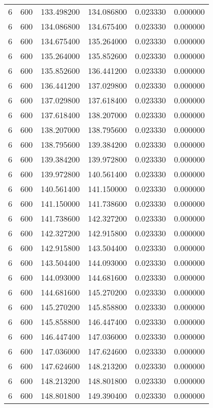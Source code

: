 \begin{longtable}{rrrrrr}
6 & 600 & 133.498200 & 134.086800 & 0.023330 & 0.000000 \\
6 & 600 & 134.086800 & 134.675400 & 0.023330 & 0.000000 \\
6 & 600 & 134.675400 & 135.264000 & 0.023330 & 0.000000 \\
6 & 600 & 135.264000 & 135.852600 & 0.023330 & 0.000000 \\
6 & 600 & 135.852600 & 136.441200 & 0.023330 & 0.000000 \\
6 & 600 & 136.441200 & 137.029800 & 0.023330 & 0.000000 \\
6 & 600 & 137.029800 & 137.618400 & 0.023330 & 0.000000 \\
6 & 600 & 137.618400 & 138.207000 & 0.023330 & 0.000000 \\
6 & 600 & 138.207000 & 138.795600 & 0.023330 & 0.000000 \\
6 & 600 & 138.795600 & 139.384200 & 0.023330 & 0.000000 \\
6 & 600 & 139.384200 & 139.972800 & 0.023330 & 0.000000 \\
6 & 600 & 139.972800 & 140.561400 & 0.023330 & 0.000000 \\
6 & 600 & 140.561400 & 141.150000 & 0.023330 & 0.000000 \\
6 & 600 & 141.150000 & 141.738600 & 0.023330 & 0.000000 \\
6 & 600 & 141.738600 & 142.327200 & 0.023330 & 0.000000 \\
6 & 600 & 142.327200 & 142.915800 & 0.023330 & 0.000000 \\
6 & 600 & 142.915800 & 143.504400 & 0.023330 & 0.000000 \\
6 & 600 & 143.504400 & 144.093000 & 0.023330 & 0.000000 \\
6 & 600 & 144.093000 & 144.681600 & 0.023330 & 0.000000 \\
6 & 600 & 144.681600 & 145.270200 & 0.023330 & 0.000000 \\
6 & 600 & 145.270200 & 145.858800 & 0.023330 & 0.000000 \\
6 & 600 & 145.858800 & 146.447400 & 0.023330 & 0.000000 \\
6 & 600 & 146.447400 & 147.036000 & 0.023330 & 0.000000 \\
6 & 600 & 147.036000 & 147.624600 & 0.023330 & 0.000000 \\
6 & 600 & 147.624600 & 148.213200 & 0.023330 & 0.000000 \\
6 & 600 & 148.213200 & 148.801800 & 0.023330 & 0.000000 \\
6 & 600 & 148.801800 & 149.390400 & 0.023330 & 0.000000 \\

\end{longtable}
